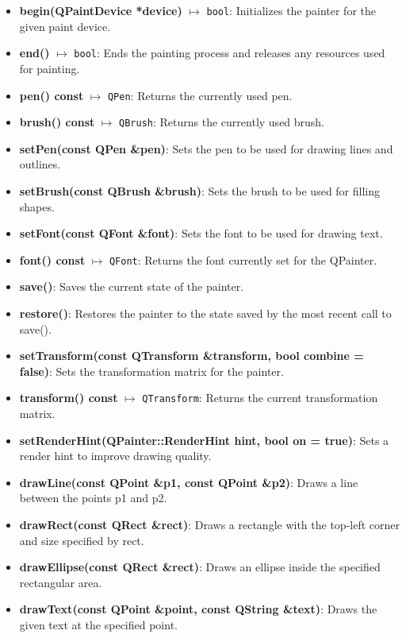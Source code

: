 \documentclass{report}
\begin{document}
    \pagebreak 
    \begin{itemize}
        \item \textbf{begin(QPaintDevice *device)} $\mapsto$ \texttt{bool}: Initializes the painter for the given paint device.
        \item \textbf{end()} $\mapsto$ \texttt{bool}: Ends the painting process and releases any resources used for painting.
        \item \textbf{pen() const} $\mapsto$ \texttt{QPen}: Returns the currently used pen.
        \item \textbf{brush() const} $\mapsto$ \texttt{QBrush}: Returns the currently used brush.
        \item \textbf{setPen(const QPen \&pen)}: Sets the pen to be used for drawing lines and outlines.
        \item \textbf{setBrush(const QBrush \&brush)}: Sets the brush to be used for filling shapes.
        \item \textbf{setFont(const QFont \&font)}: Sets the font to be used for drawing text.
        \item \textbf{font() const} $\mapsto$ \texttt{QFont}: Returns the font currently set for the QPainter.
        \item \textbf{save()}: Saves the current state of the painter.
        \item \textbf{restore()}: Restores the painter to the state saved by the most recent call to save().
        \item \textbf{setTransform(const QTransform \&transform, bool combine = false)}: Sets the transformation matrix for the painter.
        \item \textbf{transform() const} $\mapsto$ \texttt{QTransform}: Returns the current transformation matrix.
        \item \textbf{setRenderHint(QPainter::RenderHint hint, bool on = true)}: Sets a render hint to improve drawing quality.
        \item \textbf{drawLine(const QPoint \&p1, const QPoint \&p2)}: Draws a line between the points p1 and p2.
        \item \textbf{drawRect(const QRect \&rect)}: Draws a rectangle with the top-left corner and size specified by rect.
        \item \textbf{drawEllipse(const QRect \&rect)}: Draws an ellipse inside the specified rectangular area.
        \item \textbf{drawText(const QPoint \&point, const QString \&text)}: Draws the given text at the specified point.

\end{itemize}
\end{document}
